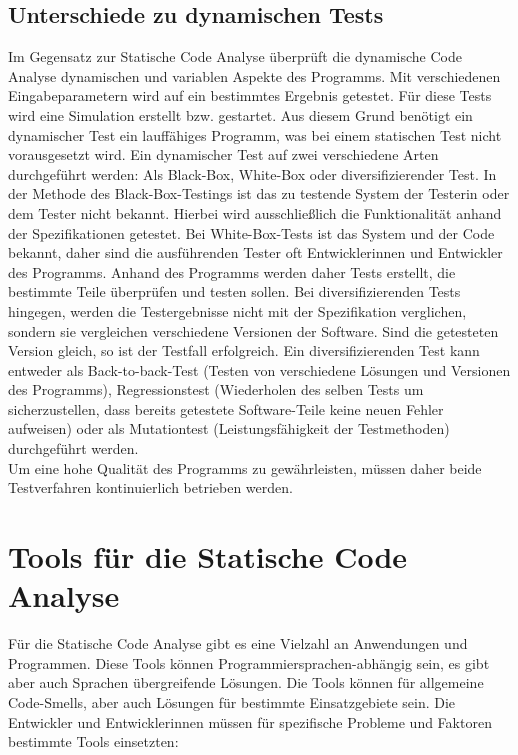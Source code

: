 \subsection{Unterschiede zu dynamischen Tests}
Im Gegensatz zur Statische Code Analyse überprüft die dynamische Code Analyse dynamischen und variablen Aspekte des Programms. Mit verschiedenen Eingabeparametern wird auf ein bestimmtes Ergebnis getestet. \cite{grigorenkoDynTest} Für diese Tests wird eine Simulation erstellt bzw. gestartet. Aus diesem Grund benötigt ein dynamischer Test ein lauffähiges Programm, was bei einem statischen Test nicht vorausgesetzt wird. Ein dynamischer Test auf zwei verschiedene Arten durchgeführt werden: Als Black-Box, White-Box oder diversifizierender Test.
In der Methode des Black-Box-Testings ist das zu testende System der Testerin oder dem Tester nicht bekannt. Hierbei wird ausschließlich die Funktionalität anhand der Spezifikationen getestet. Bei White-Box-Tests ist das System und der Code bekannt, daher sind die ausführenden Tester oft Entwicklerinnen und Entwickler des Programms. Anhand des Programms werden daher Tests erstellt, die bestimmte Teile überprüfen und testen sollen. Bei diversifizierenden Tests hingegen, werden die Testergebnisse nicht mit der Spezifikation verglichen, sondern sie vergleichen verschiedene Versionen der Software. Sind die getesteten Version gleich, so ist der Testfall erfolgreich. Ein diversifizierenden Test kann entweder als Back-to-back-Test (Testen von verschiedene Lösungen und Versionen des Programms), Regressionstest (Wiederholen des selben Tests um sicherzustellen, dass bereits getestete Software-Teile keine neuen Fehler aufweisen) oder als Mutationtest (Leistungsfähigkeit der Testmethoden) durchgeführt werden. \parencite{bommer2016softwarewartung}
\\
Um eine hohe Qualität des Programms zu gewährleisten, müssen daher beide Testverfahren kontinuierlich betrieben werden.
\section{Tools für die Statische Code Analyse}
Für die Statische Code Analyse gibt es eine Vielzahl an Anwendungen und Programmen. Diese Tools können Programmiersprachen-abhängig sein, es gibt aber auch Sprachen übergreifende Lösungen. Die Tools können für allgemeine Code-Smells, aber auch Lösungen für bestimmte Einsatzgebiete sein. Die Entwickler und Entwicklerinnen müssen für  spezifische Probleme und Faktoren bestimmte Tools einsetzten:


